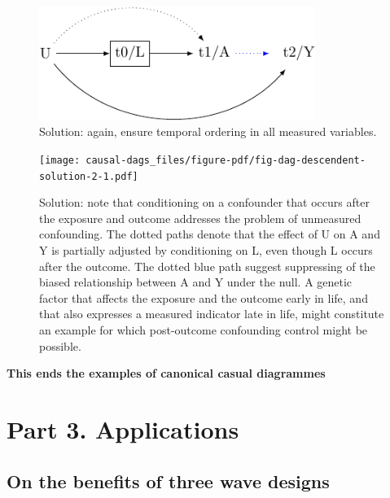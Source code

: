 \documentclass[
  singlecolumn]{report}
\begin{document}
\begin{figure}

{\centering \includegraphics[width=0.8\textwidth,height=\textheight]{causal-dags_files/figure-pdf/fig-dag-descendent-solution-1.pdf}

}

\caption{\label{fig-dag-descendent-solution}Solution: again, ensure
temporal ordering in all measured variables.}

\end{figure}

\begin{figure}

{\centering \texttt{[image: causal-dags\_files/figure-pdf/fig-dag-descendent-solution-2-1.pdf]}

}

\caption{\label{fig-dag-descendent-solution-2}Solution: note that
conditioning on a confounder that occurs after the exposure and outcome
addresses the problem of unmeasured confounding. The dotted paths denote
that the effect of U on A and Y is partially adjusted by conditioning on
L, even though L occurs after the outcome. The dotted blue path suggest
suppressing of the biased relationship between A and Y under the null. A
genetic factor that affects the exposure and the outcome early in life,
and that also expresses a measured indicator late in life, might
constitute an example for which post-outcome confounding control might
be possible.}

\end{figure}

\textbf{This ends the examples of canonical casual diagrammes}

\hypertarget{part-3.-applications}{%
\section{Part 3. Applications}\label{part-3.-applications}}

\hypertarget{on-the-benefits-of-three-wave-designs}{%
\subsection{On the benefits of three wave
designs}\label{on-the-benefits-of-three-wave-designs}}
\end{document}
